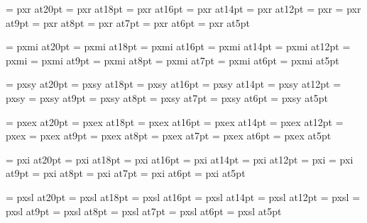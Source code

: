 
\font\twentyrm=     pxr at20pt
\font\eighteenrm=   pxr at18pt
\font\sixteenrm=    pxr at16pt
\font\fourteenrm=   pxr at14pt
\font\twelverm=     pxr at12pt
\font\tenrm=        pxr  %
\font\ninerm=       pxr at9pt
\font\eightrm=      pxr at8pt
\font\sevenrm=      pxr at7pt
\font\sixrm=        pxr at6pt
\font\fiverm=       pxr at5pt

\font\twentyi=      pxmi at20pt
\font\eighteeni=    pxmi at18pt
\font\sixteeni=     pxmi at16pt
\font\fourteeni=    pxmi at14pt
\font\twelvei=      pxmi at12pt
\font\teni=         pxmi
\font\ninei=        pxmi at9pt
\font\eighti=       pxmi at8pt
\font\seveni=       pxmi at7pt
\font\sixi=         pxmi at6pt
\font\fivei=        pxmi at5pt

\font\twentysy=     pxsy at20pt
\font\eighteensy=   pxsy at18pt
\font\sixteensy=    pxsy at16pt
\font\fourteensy=   pxsy at14pt
\font\twelvesy=     pxsy at12pt
\font\tensy=        pxsy
\font\ninesy=       pxsy at9pt
\font\eightsy=      pxsy at8pt
\font\sevensy=      pxsy at7pt
\font\sixsy=        pxsy at6pt
\font\fivesy=       pxsy at5pt

\font\twentyex=     pxex at20pt
\font\eighteenex=   pxex at18pt
\font\sixteenex=    pxex at16pt
\font\fourteenex=   pxex at14pt
\font\twelveex=     pxex at12pt
\font\tenex=        pxex
\font\nineex=       pxex at9pt
\font\eightex=      pxex at8pt
\font\sevenex=      pxex at7pt
\font\sixex=        pxex at6pt
\font\fiveex=       pxex at5pt

\font\twentyit=     pxi at20pt
\font\eighteenit=   pxi at18pt
\font\sixteenit=    pxi at16pt
\font\fourteenit=   pxi at14pt
\font\twelveit=     pxi at12pt
\font\tenit=        pxi
\font\nineit=       pxi at9pt
\font\eightit=      pxi at8pt
\font\sevenit=      pxi at7pt
\font\sixit=        pxi at6pt
\font\fiveit=       pxi at5pt

\font\twentysl=     pxsl at20pt
\font\eighteensl=   pxsl at18pt
\font\sixteensl=    pxsl at16pt
\font\fourteensl=   pxsl at14pt
\font\twelvesl=     pxsl at12pt
\font\tensl=        pxsl
\font\ninesl=       pxsl at9pt
\font\eightsl=      pxsl at8pt
\font\sevensl=      pxsl at7pt
\font\sixsl=        pxsl at6pt
\font\fivesl=       pxsl at5pt

